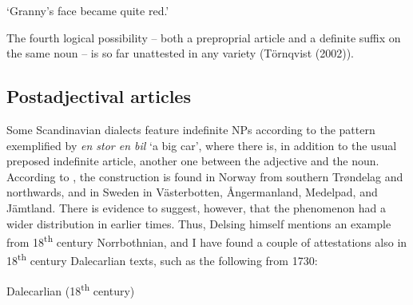 \begin{styleTranslation}
‘Granny’s face became quite red.’ 

\end{styleTranslation}

\begin{styleBodyTextFirst}
The fourth logical possibility – both a preproprial article and a definite suffix on the same noun – is so far unattested in any variety (Törnqvist (2002)). 

\end{styleBodyTextFirst}

\subsection{\rmfamily Postadjectival articles}

\begin{styleBodyTextFirst}
Some Scandinavian dialects feature indefinite NPs according to the pattern exemplified by \textit{en stor en bil }‘a big car’, where there is, in addition to the usual preposed indefinite article, another one between the adjective and the noun. According to \citet[46]{Delsing2003a}, the construction is found in Norway from southern Trøndelag and northwards, and in Sweden in Västerbotten, Ångermanland, Medelpad, and Jämtland. There is evidence to suggest, however, that the phenomenon had a wider distribution in earlier times. Thus, Delsing himself mentions an example from 18\textsuperscript{th} century Norrbothnian, and I have found a couple of attestations also in 18\textsuperscript{th} century Dalecarlian texts, such as the following from 1730: 

\end{styleBodyTextFirst}

\begin{listWWNumileveli}
\item {}

\begin{styleExample}
Dalecarlian (18\textsuperscript{th} century)

\end{styleExample}

\end{listWWNumileveli}

